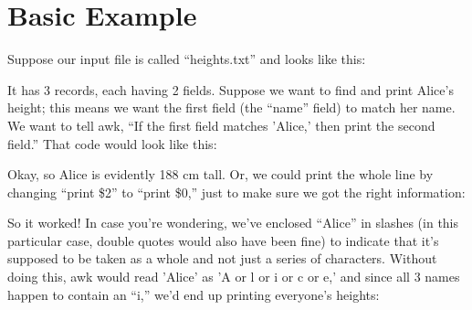 \documentclass[10pt]{article}
\begin{document}
\section*{Basic Example}

Suppose our input file is called ``heights.txt'' and looks like this:

\ttfamily
\colorbox{black}{}
\normalfont

It has 3 records, each having 2 fields. Suppose we want to find and print Alice's height; this means we want the first field (the ``name'' field) to match her name. We want to tell awk, ``If the first field matches 'Alice,' then print the second field.'' That code would look like this:

\ttfamily
\colorbox{black}{}
\normalfont

Okay, so Alice is evidently 188 cm tall. Or, we could print the whole line by changing ``print \$2'' to ``print \$0,'' just to make sure we got the right information:

\ttfamily
\colorbox{black}{}
\normalfont

So it worked! In case you're wondering, we've enclosed ``Alice'' in slashes (in this particular case, double quotes would also have been fine) to indicate that it's supposed to be taken as a whole and not just a series of characters. Without doing this, awk would read 'Alice' as 'A or l or i or c or e,' and since all 3 names happen to contain an ``i,'' we'd end up printing everyone's heights:
\end{document}
